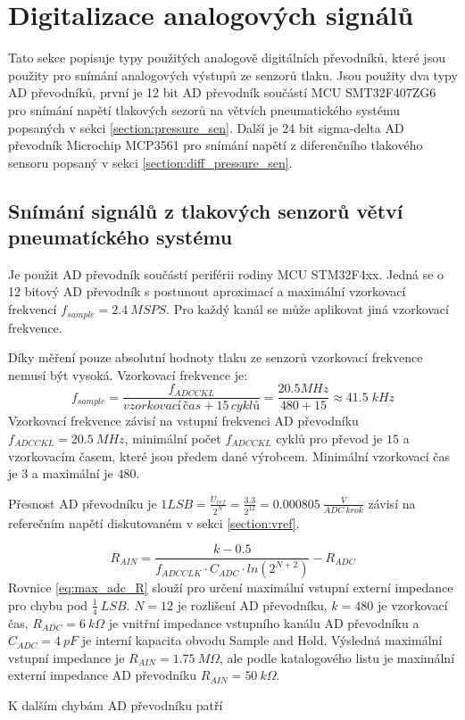 \section{Digitalizace analogových signálů}
Tato sekce popisuje typy použitých analogově digitálních převodníků, které jsou použity pro snímání analogových výstupů ze senzorů tlaku. Jsou použity dva typy AD převodníků, první je 12 bit AD převodník součástí MCU SMT32F407ZG6 pro snímání napětí tlakových sezorů na větvích pneumatického systému popsaných v sekci \ref{section:pressure_sen}.
Další je 24 bit sigma-delta AD převodník Microchip MCP3561 pro snímání napětí z diferenčního tlakového sensoru popsaný v sekci \ref{section:diff_pressure_sen}.

\subsection{Snímání signálů z tlakových senzorů větví pneumatíckého systému}
Je použit AD převodník součástí periférii rodiny MCU STM32F4xx. Jedná se o 12 bitový AD převodník s postunout aproximací a maximální vzorkovací frekvencí $f_{sample} = 2.4 \ MSPS$. Pro každý kanál se může aplikovat jiná vzorkovací frekvence. \par
Díky měření pouze absolutní hodnoty tlaku ze senzorů vzorkovací frekvence nemusí být vysoká. Vzorkovací frekvence je:
\begin{equation}
    f_{sample}=\frac{f_{ADCCKL}}{vzorkovací \, čas + 15 \, cyklů } = \frac{20.5 \! MHz}{480 + 15} \approx 41.5 \; kHz
\end{equation}
Vzorkovací frekvence závisí na vstupní frekvenci AD převodníku $f_{ADCCKL} = 20.5 \ MHz$, minimální počet $f_{ADCCKL} $ cyklů pro převod je $15$ a vzorkovacím časem, které jsou předem dané výrobcem. Minimální vzorkovací čas je $3$ a maximální je $480$.
\par
Přesnost AD převodníku je $1 LSB = \frac{U_{ref}}{2^N} = \frac{3.3}{2^{12}} = 0.000805 \ \frac{V}{ADC \ krok}$ závisí na referečním napětí diskutovaném v sekci \ref{section:vref}.

\begin{equation} \label{eq:max_adc_R}
    R_{AIN} = \frac{k - 0.5}{f_{ADCCLK} \cdot C_{ADC} \cdot ln(2^{N+2})} - R_{ADC}
\end{equation}
Rovnice \ref{eq:max_adc_R} slouží pro určení maximální vstupní externí impedance pro chybu pod $\frac{1}{4} \ LSB$. $N = 12$ je rozlišení AD převodníku, $k = 480$ je vzorkovací čas, $R_{ADC} = 6 \ k\Omega$ je vnitřní impedance vstupního kanálu AD převodníku a
$C_{ADC} = 4 \ pF$ je interní kapacita obvodu Sample and Hold. Výsledná maximální vstupní impedance je $R_{AIN} = 1.75 \ M\Omega$, ale podle katalogového listu je maximální externí impedance AD převodníku $R_{AIN} = 50 \ k\Omega$.
\par
K dalším chybám AD převodníku patří

